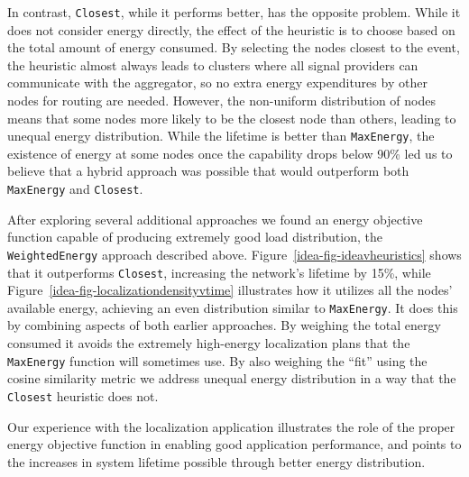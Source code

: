 In contrast, \texttt{Closest}, while it performs better, has the opposite
problem. While it does not consider energy directly, the effect of the
heuristic is to choose based on the total amount of energy consumed. By
selecting the nodes closest to the event, the heuristic almost always leads
to clusters where all signal providers can communicate with the aggregator,
so no extra energy expenditures by other nodes for routing are needed.
However, the non-uniform distribution of nodes means that some nodes more
likely to be the closest node than others, leading to unequal energy
distribution. While the lifetime is better than \texttt{MaxEnergy}, the
existence of energy at some nodes once the capability drops below 90\% led us
to believe that a hybrid approach was possible that would outperform both
\texttt{MaxEnergy} and \texttt{Closest}.

After exploring several additional approaches we found an energy objective
function capable of producing extremely good load distribution, the
\texttt{WeightedEnergy} approach described above.
Figure~\ref{idea-fig-ideavheuristics} shows that it outperforms
\texttt{Closest}, increasing the network's lifetime by 15\%, while
Figure~\ref{idea-fig-localizationdensityvtime} illustrates how it utilizes
all the nodes' available energy, achieving an even distribution similar to
\texttt{MaxEnergy}. It does this by combining aspects of both earlier
approaches. By weighing the total energy consumed it avoids the extremely
high-energy localization plans that the \texttt{MaxEnergy} function will
sometimes use. By also weighing the ``fit'' using the cosine similarity
metric we address unequal energy distribution in a way that the
\texttt{Closest} heuristic does not.

Our experience with the localization application illustrates the role of the
proper energy objective function in enabling good application performance,
and points to the increases in system lifetime possible through better energy
distribution. 
